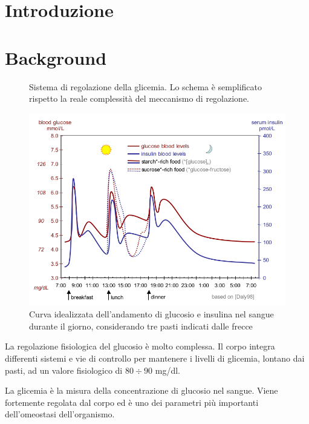 \section{Introduzione}

\textcolor{blue}{\lipsum[1-2]}

\section{Background}

\begin{figure}[t!]
	\centering
	\scriptsize{\def\svgwidth{0.95\linewidth}
		}
	\caption{Sistema di regolazione della glicemia. Lo schema è semplificato rispetto la reale complessità del meccanismo di regolazione.}
	\label{fig:glucoseregolation}
\end{figure}


\begin{figure}[b!]
	\centering
	\includegraphics[width=0.99\linewidth]{figures/glucose_regolation2}
	\caption{Curva idealizzata dell'andamento di glucosio e insulina nel sangue durante il giorno, considerando tre pasti indicati dalle frecce \cite{daly_acute_1998}}
	\label{fig:glucoseregolation2}
\end{figure}

La regolazione fisiologica del glucosio è molto complessa. Il corpo integra differenti sistemi e vie di controllo per mantenere i livelli di glicemia, lontano dai pasti, ad un valore fisiologico di $80\div 90$ mg/dl.

La glicemia è la misura della concentrazione di glucosio nel sangue. Viene fortemente regolata dal corpo ed è uno dei parametri più importanti dell'omeostasi dell'organismo. 

